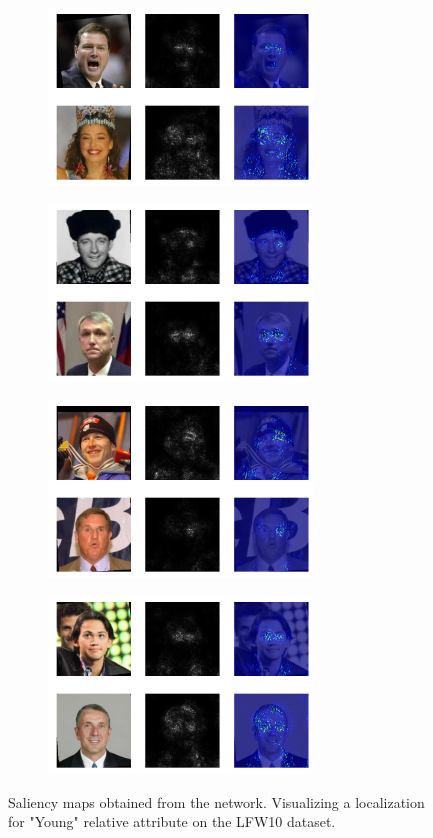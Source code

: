\documentclass[10pt,twocolumn,letterpaper]{article}
\begin{document}
\begin{figure}
    \centering
    \begin{subfigure}
        \centering
        \includegraphics[width=7cm]{saliency-new/LFW/young-1}
    \end{subfigure}
    \begin{subfigure}
        \centering
        \includegraphics[width=7cm]{saliency-new/LFW/young-2}
    \end{subfigure}
    \begin{subfigure}
        \centering
        \includegraphics[width=7cm]{saliency-new/LFW/young-4}
    \end{subfigure}
    \begin{subfigure}
        \centering
        \includegraphics[width=7cm]{saliency-new/LFW/young-6}
    \end{subfigure}
    
    \caption{Saliency maps obtained from the network. Visualizing a localization for "Young" relative attribute on the LFW10 dataset.}
    \label{sal.lfw.young}
\end{figure}
\end{document}
